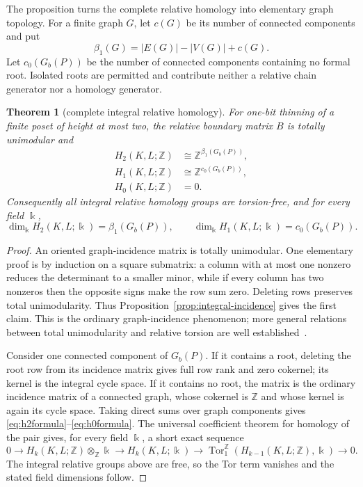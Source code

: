\documentclass[11pt]{article}
\newtheorem{theorem}{Theorem}[section]
\theoremstyle{definition}
\theoremstyle{remark}
\newcommand{\Z}{\mathbb Z}
\begin{document}
The proposition turns the complete relative homology into elementary graph topology.
For a finite graph $G$, let $c(G)$ be its number of connected components and put
\[
  \beta_1(G)=|E(G)|-|V(G)|+c(G).
\]
Let $c_0(G_b(P))$ be the number of connected components containing no formal root.
Isolated roots are permitted and contribute neither a relative chain generator nor a
homology generator.

\begin{theorem}[complete integral relative homology]\label{thm:integral-homology}
For one-bit thinning of a finite poset of height at most two, the relative boundary
matrix $B$ is totally unimodular and
\begin{align}
  H_2(K,L;\Z)&\cong\Z^{\beta_1(G_b(P))},\label{eq:h2formula}\\
  H_1(K,L;\Z)&\cong\Z^{c_0(G_b(P))},\label{eq:h1formula}\\
  H_0(K,L;\Z)&=0.\label{eq:h0formula}
\end{align}
Consequently all integral relative homology groups are torsion-free, and for every
field $\Bbbk$,
\[
  \dim_{\Bbbk}H_2(K,L;\Bbbk)=\beta_1(G_b(P)),\qquad
  \dim_{\Bbbk}H_1(K,L;\Bbbk)=c_0(G_b(P)).
\]
\end{theorem}

\begin{proof}
An oriented graph-incidence matrix is totally unimodular.  One elementary proof is by
induction on a square submatrix: a column with at most one nonzero reduces the
determinant to a smaller minor, while if every column has two nonzeros then the
opposite signs make the row sum zero.  Deleting rows preserves total unimodularity.
Thus Proposition~\ref{prop:integral-incidence} gives the first claim.  This is the
ordinary graph-incidence phenomenon; more general relations between total
unimodularity and relative torsion are well established~\cite{DeyHiraniKrishnamoorthy2011}.

Consider one connected component of $G_b(P)$.  If it contains a root, deleting the
root row from its incidence matrix gives full row rank and zero cokernel; its kernel
is the integral cycle space.  If it contains no root, the matrix is the ordinary
incidence matrix of a connected graph, whose cokernel is $\Z$ and whose kernel is
again its cycle space.  Taking direct sums over graph components gives
\eqref{eq:h2formula}--\eqref{eq:h0formula}.  The universal coefficient theorem for
homology of the pair gives, for every field $\Bbbk$, a short exact sequence
\[
  0\longrightarrow H_k(K,L;\Z)\otimes_{\Z}\Bbbk
  \longrightarrow H_k(K,L;\Bbbk)
  \longrightarrow \operatorname{Tor}^{\Z}_1(H_{k-1}(K,L;\Z),\Bbbk)
  \longrightarrow0.
\]
The integral relative groups above are free, so the Tor term vanishes and the stated
field dimensions follow.
\end{proof}
\end{document}
